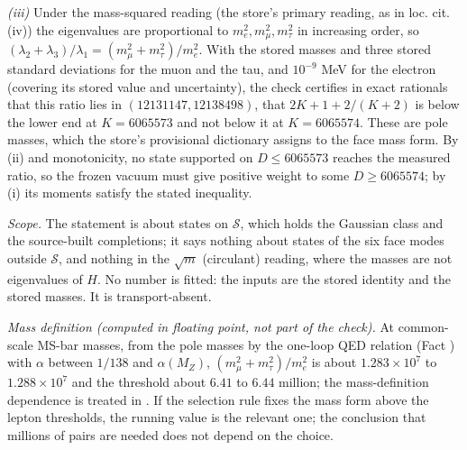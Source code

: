 \emph{(iii)} Under the mass-squared reading (the store's primary reading, as in loc. cit. (iv)) the eigenvalues are proportional to $m_{e}^{2}, m_{\mu}^{2}, m_{\tau}^{2}$ in increasing order, so $(\lambda_{2} + \lambda_{3})/\lambda_{1} = (m_{\mu}^{2} + m_{\tau}^{2})/m_{e}^{2}$. With the stored masses and three stored standard deviations for the muon and the tau, and $10^{-9}$ MeV for the electron (covering its stored value and uncertainty), the check certifies in exact rationals that this ratio lies in $(12131147, 12138498)$, that $2K + 1 + 2/(K + 2)$ is below the lower end at $K = 6065573$ and not below it at $K = 6065574$. These are pole masses, which the store's provisional dictionary assigns to the face mass form. By (ii) and monotonicity, no state supported on $D \le 6065573$ reaches the measured ratio, so the frozen vacuum must give positive weight to some $D \ge 6065574$; by (i) its moments satisfy the stated inequality.

\emph{Scope.} The statement is about states on $\mathcal{S}$, which holds the Gaussian class and the source-built completions; it says nothing about states of the six face modes outside $\mathcal{S}$, and nothing in the $\sqrt{m}$ (circulant) reading, where the masses are not eigenvalues of $H$. No number is fitted: the inputs are the stored identity and the stored masses. It is transport-absent.

\emph{Mass definition (computed in floating point, not part of the check).} At common-scale MS-bar masses, from the pole masses by the one-loop QED relation (Fact ) with $\alpha$ between $1/138$ and $\alpha(M_{Z})$, $(m_{\mu}^{2} + m_{\tau}^{2})/m_{e}^{2}$ is about $1.283 \times 10^{7}$ to $1.288 \times 10^{7}$ and the threshold about $6.41$ to $6.44$ million; the mass-definition dependence is treated in . If the selection rule fixes the mass form above the lepton thresholds, the running value is the relevant one; the conclusion that millions of pairs are needed does not depend on the choice.
